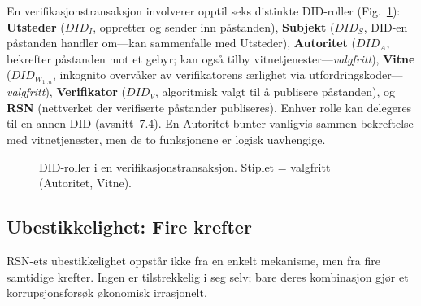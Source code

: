 \documentclass[11pt,a4paper,twocolumn]{article}
\begin{document}
En verifikasjonstransaksjon involverer opptil seks distinkte DID-roller (Fig.~\ref{fig:roles}): \textbf{Utsteder} ($DID_I$, oppretter og sender inn påstanden), \textbf{Subjekt} ($DID_S$, DID-en påstanden handler om---kan sammenfalle med Utsteder), \textbf{Autoritet} ($DID_A$, bekrefter påstanden mot et gebyr; kan også tilby vitnetjenester---\emph{valgfritt}), \textbf{Vitne} ($DID_{W_{1..n}}$, inkognito overvåker av verifikatorens ærlighet via utfordringskoder---\emph{valgfritt}), \textbf{Verifikator} ($DID_V$, algoritmisk valgt til å publisere påstanden), og \textbf{RSN} (nettverket der verifiserte påstander publiseres). Enhver rolle kan delegeres til en annen DID (avsnitt~7.4). En Autoritet bunter vanligvis sammen bekreftelse med vitnetjenester, men de to funksjonene er logisk uavhengige.

\begin{figure}[ht]
\centering
{}
\caption{DID-roller i en verifikasjonstransaksjon. Stiplet = valgfritt (Autoritet, Vitne).}
\label{fig:roles}
\end{figure}

\subsection{Ubestikkelighet: Fire krefter}

RSN-ets ubestikkelighet oppstår ikke fra en enkelt mekanisme, men fra fire samtidige krefter. Ingen er tilstrekkelig i seg selv; bare deres kombinasjon gjør et korrupsjonsforsøk økonomisk irrasjonelt.
\end{document}
